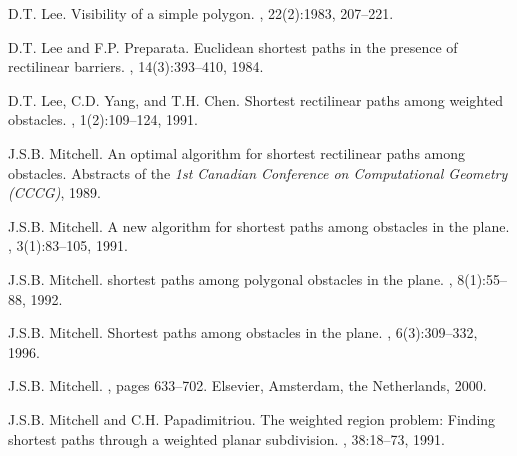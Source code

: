\documentclass[english,runningheads,11pt]{llncs}
\begin{document}
\begin{thebibliography}{10}
D.T. Lee.
\newblock Visibility of a simple polygon.
, 22(2):1983,
  207--221.

D.T. Lee and F.P. Preparata.
\newblock Euclidean shortest paths in the presence of rectilinear barriers.
, 14(3):393--410, 1984.

D.T. Lee, C.D. Yang, and T.H. Chen.
\newblock Shortest rectilinear paths among weighted obstacles.
, 1(2):109--124, 1991.

J.S.B. Mitchell.
\newblock An optimal algorithm for shortest rectilinear paths among obstacles.
\newblock Abstracts of the {\em 1st Canadian Conference on Computational
  Geometry (CCCG)}, 1989.

J.S.B. Mitchell.
\newblock A new algorithm for shortest paths among obstacles in the plane.
,
  3(1):83--105, 1991.

J.S.B. Mitchell.
\newblock {} shortest paths among polygonal obstacles in the plane.
, 8(1):55--88, 1992.

J.S.B. Mitchell.
\newblock Shortest paths among obstacles in the plane.
, 6(3):309--332, 1996.

J.S.B. Mitchell.
,
  pages 633--702.
\newblock Elsevier, Amsterdam, the Netherlands, 2000.

J.S.B. Mitchell and C.H. Papadimitriou.
\newblock The weighted region problem: Finding shortest paths through a
  weighted planar subdivision.
, 38:18--73, 1991.

\end{thebibliography}
\end{document}
